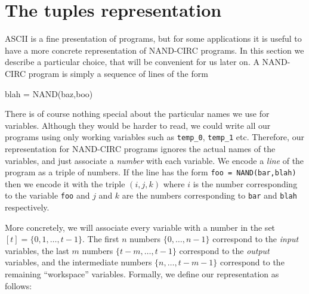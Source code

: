 \section{The tuples representation}\label{listoftuplesrepsec}

ASCII is a fine presentation of programs, but for some applications it
is useful to have a more concrete representation of NAND-CIRC programs.
In this section we describe a particular choice, that will be convenient
for us later on. A NAND-CIRC program is simply a sequence of lines of
the form

\begin{code}
blah = NAND(baz,boo)
\end{code}

There is of course nothing special about the particular names we use for
variables. Although they would be harder to read, we could write all our
programs using only working variables such as \texttt{temp\_0},
\texttt{temp\_1} etc. Therefore, our representation for NAND-CIRC
programs ignores the actual names of the variables, and just associate a
\emph{number} with each variable. We encode a \emph{line} of the program
as a triple of numbers. If the line has the form
\texttt{foo = NAND(bar,blah)} then we encode it with the triple
\((i,j,k)\) where \(i\) is the number corresponding to the variable
\texttt{foo} and \(j\) and \(k\) are the numbers corresponding to
\texttt{bar} and \texttt{blah} respectively.

More concretely, we will associate every variable with a number in the
set \([t]= \{0,1,\ldots,t-1\}\). The first \(n\) numbers
\(\{0,\ldots,n-1\}\) correspond to the \emph{input} variables, the last
\(m\) numbers \(\{t-m,\ldots,t-1\}\) correspond to the \emph{output}
variables, and the intermediate numbers \(\{ n,\ldots, t-m-1\}\)
correspond to the remaining ``workspace'' variables. Formally, we define
our representation as follows:

\hypertarget{nandtuplesdef}{}

